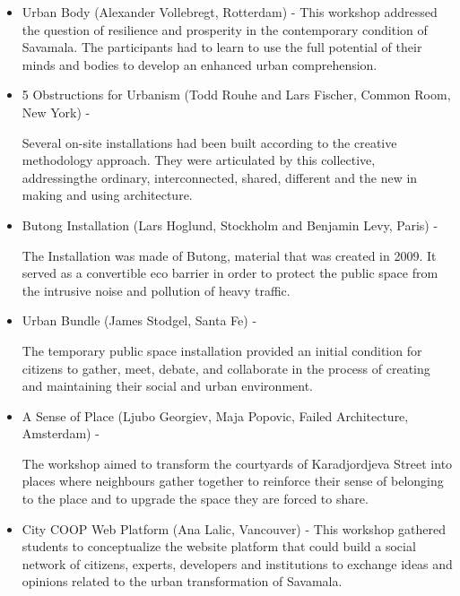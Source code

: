 \documentclass[11pt]{report}
\begin{document}
{{{{{\begin{itemize}
This artistic workshop promoted an ethnological approach towards research that could interpret the urban devastation through qualitative data. 

\item Urban Body (Alexander Vollebregt, Rotterdam) -
This workshop addressed the question of resilience and prosperity in the contemporary condition of Savamala. The participants had to learn to use the full potential of their minds and bodies to develop an enhanced urban comprehension.

\item 5 Obstructions for Urbanism (Todd Rouhe and Lars Fischer, Common Room, New York) -

Several on-site installations had been built according to the creative methodology approach. They were articulated by this collective, addressingthe  ordinary, interconnected, shared, different and the new in making and using architecture.

\item Butong Installation (Lars Hoglund, Stockholm and Benjamin Levy, Paris) - 

The Installation was made of Butong, material that was created in 2009. It served as a convertible eco barrier in order to protect the public space from the intrusive noise and pollution of heavy traffic.

\item Urban Bundle (James Stodgel, Santa Fe) -

The temporary public space installation provided an initial condition for citizens to gather, meet, debate, and collaborate in the process of creating and maintaining their social and urban environment.  

\item A Sense of Place (Ljubo Georgiev, Maja Popovic, Failed Architecture, Amsterdam) -

The workshop aimed to transform the courtyards of Karadjordjeva Street  into places where neighbours gather together to reinforce their sense of belonging to the place and to upgrade the space they are forced to share.

\item City COOP Web Platform (Ana Lalic, Vancouver) -
This workshop gathered students to conceptualize the website platform that could build a social network of citizens, experts, developers and institutions to exchange ideas and opinions related to the urban transformation of Savamala.  
\end{itemize}
}
\\

}}}}
\end{document}
